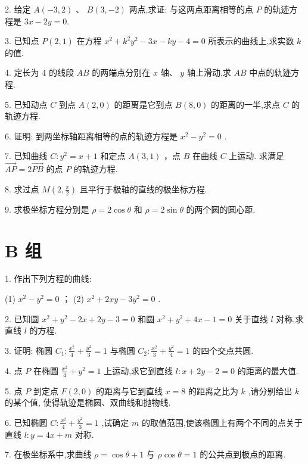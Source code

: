 \documentclass[10pt]{article}
\begin{document}
2. 给定 \(A\left( {-3,2}\right) \text{ 、 }B\left( {3, - 2}\right)\) 两点,求证: 与这两点距离相等的点 \(P\) 的轨迹方程是 \({3x} - {2y} = 0.\)

3. 已知点 \(P\left( {2,1}\right)\) 在方程 \({x}^{2} + {k}^{2}{y}^{2} - {3x} - {ky} - 4 = 0\) 所表示的曲线上,求实数 \(k\) 的值.

4. 定长为 4 的线段 \({AB}\) 的两端点分别在 \(x\) 轴、 \(y\) 轴上滑动,求 \({AB}\) 中点的轨迹方程.

5. 已知动点 \(C\) 到点 \(A\left( {2,0}\right)\) 的距离是它到点 \(B\left( {8,0}\right)\) 的距离的一半,求点 \(C\) 的轨迹方程.

6. 证明: 到两坐标轴距离相等的点的轨迹方程是 \({x}^{2} - {y}^{2} = 0\) .

7. 已知曲线 \(C : {y}^{2} = x + 1\) 和定点 \(A\left( {3,1}\right)\) ，点 \(B\) 在曲线 \(C\) 上运动. 求满足 \(\overrightarrow{AP} = 2\overrightarrow{PB}\) 的点 \(P\) 的轨迹方程.

8. 求过点 \(M\left( {2,\frac{\pi }{2}}\right)\) 且平行于极轴的直线的极坐标方程.

9. 求极坐标方程分别是 \(\rho  = 2\cos \theta\) 和 \(\rho  = 2\sin \theta\) 的两个圆的圆心距.

\section*{B 组}

1. 作出下列方程的曲线:

(1) \({x}^{2} - {y}^{2} = 0\) ； (2) \({x}^{2} + {2xy} - 3{y}^{2} = 0\) .

2. 已知圆 \({x}^{2} + {y}^{2} - {2x} + {2y} - 3 = 0\) 和圆 \({x}^{2} + {y}^{2} + {4x} - 1 = 0\) 关于直线 \(l\) 对称,求直线 \(l\) 的方程.

3. 证明: 椭圆 \({C}_{1} : \frac{{x}^{2}}{4} + \frac{{y}^{2}}{3} = 1\) 与椭圆 \({C}_{2} : \frac{{x}^{2}}{3} + \frac{{y}^{2}}{4} = 1\) 的四个交点共圆.

4. 点 \(P\) 在椭圆 \(\frac{{x}^{2}}{4} + {y}^{2} = 1\) 上运动,求它到直线 \(l : x + {2y} - 2 = 0\) 的距离的最大值.

5. 点 \(P\) 到定点 \(F\left( {2,0}\right)\) 的距离与它到直线 \(x = 8\) 的距离之比为 \(k\) ,请分别给出 \(k\) 的某个值, 使得轨迹是椭圆、双曲线和抛物线.

6. 已知椭圆 \(C : \frac{{x}^{2}}{4} + \frac{{y}^{2}}{3} = 1\) ,试确定 \(m\) 的取值范围,使该椭圆上有两个不同的点关于直线 \(l : y = {4x} + m\) 对称.

7. 在极坐标系中,求曲线 \(\rho  = \cos \theta  + 1\) 与 \(\rho \cos \theta  = 1\) 的公共点到极点的距离.
\end{document}
